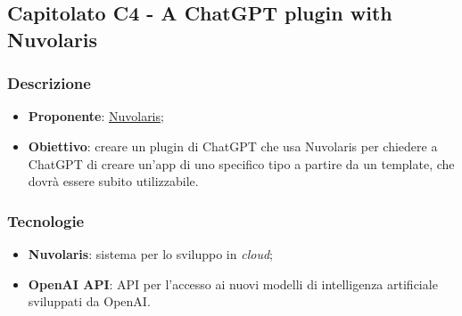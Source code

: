 \subsection{Capitolato C4 - A ChatGPT plugin with Nuvolaris}


\subsubsection{Descrizione}
\begin{itemize}
    \item \textbf{Proponente}: \href{https://www.nuvolaris.io/}{Nuvolaris};
    \item \textbf{Obiettivo}: creare un plugin di ChatGPT che usa Nuvolaris per chiedere a ChatGPT di creare un'app di uno specifico tipo a partire da un template, che dovrà essere subito utilizzabile.
\end{itemize}


\subsubsection{Tecnologie}
\begin{itemize}
    \item \textbf{Nuvolaris}: sistema per lo sviluppo in \textit{cloud};
    \item \textbf{OpenAI API}: API per l'accesso ai nuovi modelli di intelligenza artificiale sviluppati da OpenAI.
\end{itemize}


